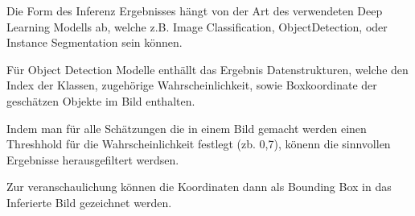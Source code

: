 
Die Form des Inferenz Ergebnisses hängt von der 
Art des verwendeten Deep Learning Modells ab, welche 
z.B. Image Classification, ObjectDetection, oder Instance
Segmentation sein können.

Für Object Detection Modelle enthällt das Ergebnis Datenstrukturen, 
welche den Index der Klassen, zugehörige Wahrscheinlichkeit, 
sowie Boxkoordinate der geschätzen Objekte im Bild enthalten.

Indem man für alle Schätzungen die in einem Bild gemacht werden 
einen Threshhold für die Wahrscheinlichkeit festlegt (zb. 0,7),
könenn die sinnvollen Ergebnisse herausgefiltert werdsen.

Zur veranschaulichung können die Koordinaten dann 
als Bounding Box in das Inferierte Bild gezeichnet werden.
